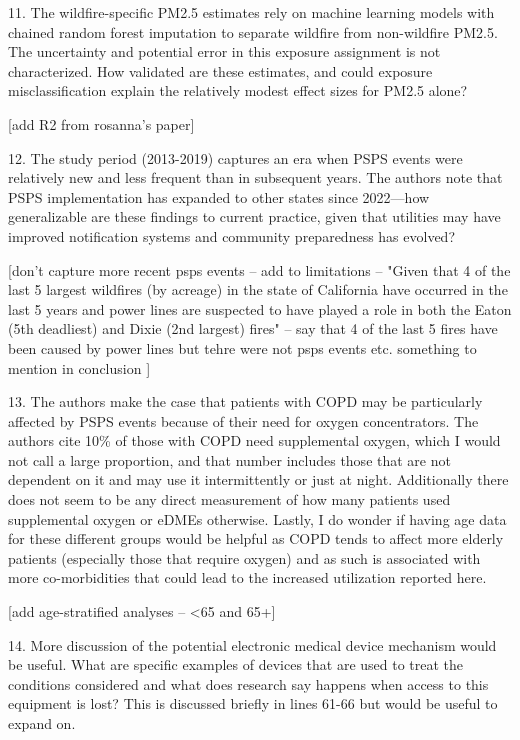 11.     The wildfire-specific PM2.5 estimates rely on machine learning models with chained random forest imputation to separate wildfire from non-wildfire PM2.5. The uncertainty and potential error in this exposure assignment is not characterized. How validated are these estimates, and could exposure misclassification explain the relatively modest effect sizes for PM2.5 alone?

[add R2 from rosanna's paper]

12.     The study period (2013-2019) captures an era when PSPS events were relatively new and less frequent than in subsequent
years. The authors note that PSPS implementation has expanded to other states since 2022—how generalizable are these findings to current practice, given that utilities may have improved notification systems and community preparedness has evolved?

[don't capture more recent psps events -- add to limitations -- "Given that 4 of the last 5 largest wildfires (by acreage) in the state of California have occurred in the last 5 years and power lines are suspected to have played a role in both the Eaton (5th deadliest) and Dixie (2nd largest) fires" -- say that 4 of the last 5 fires have been caused by power lines but tehre were not psps events etc. something to mention in conclusion ]



13.      The authors make the case that patients with COPD may be particularly affected by PSPS events because of their need for oxygen concentrators. The authors cite 10\% of those with COPD need supplemental oxygen, which I would not call a large proportion, and that number includes those that are not dependent on it and may use it intermittently or just at night. Additionally there does not seem to be any direct measurement of how many patients used supplemental oxygen or eDMEs otherwise. Lastly, I do wonder if having age data for these different groups would be helpful as COPD tends to affect more elderly patients (especially those that require oxygen) and as such is associated with more co-morbidities that could lead to the increased utilization reported here.

[add age-stratified analyses -- <65 and 65+]
    
14.      More discussion of the potential electronic medical device mechanism would be useful. What are specific examples of devices that are used to treat the conditions considered and what does research say happens when access to this equipment is lost? This is discussed briefly in lines 61-66 but would be useful to expand on.

